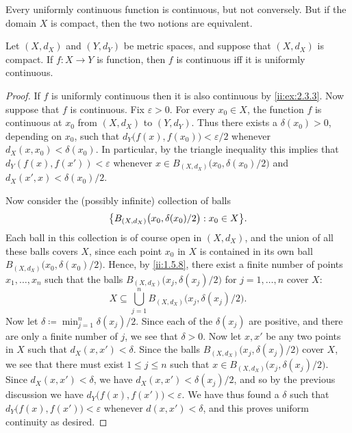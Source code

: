 \begin{note}
  Every uniformly continuous function is continuous, but not conversely.
  But if the domain \(X\) is compact, then the two notions are equivalent.
\end{note}

\begin{thm}\label{ii:2.3.5}
  Let \((X, d_X)\) and \((Y, d_Y)\) be metric spaces, and suppose that \((X, d_X)\) is compact.
  If \(f : X \to Y\) is function, then \(f\) is continuous iff it is uniformly continuous.
\end{thm}

\begin{proof}
  If \(f\) is uniformly continuous then it is also continuous by \cref{ii:ex:2.3.3}.
  Now suppose that \(f\) is continuous.
  Fix \(\varepsilon > 0\).
  For every \(x_0 \in X\), the function \(f\) is continuous at \(x_0\) from \((X, d_X)\) to \((Y, d_Y)\).
  Thus there exists a \(\delta(x_0) > 0\), depending on \(x_0\), such that \(d_Y\big(f(x), f(x_0)\big) < \varepsilon / 2\) whenever \(d_X(x, x_0) < \delta(x_0)\).
  In particular, by the triangle inequality this implies that \(d_Y(f(x), f(x')) < \varepsilon\) whenever \(x \in B_{(X, d_X)}\big(x_0, \delta(x_0) / 2\big)\) and \(d_X(x', x) < \delta(x_0) / 2\).

  Now consider the (possibly infinite) collection of balls
  \[
    \set{B_{(X, d_X)}\big(x_0, \delta(x_0) / 2\big) : x_0 \in X}.
  \]
  Each ball in this collection is of course open in \((X, d_X)\), and the union of all these balls covers \(X\), since each point \(x_0\) in \(X\) is contained in its own ball \(B_{(X, d_X)}\big(x_0, \delta(x_0) / 2\big)\).
  Hence, by \cref{ii:1.5.8}, there exist a finite number of points \(x_1, \dots, x_n\) such that the balls \(B_{(X, d_X)}\big(x_j, \delta(x_j) / 2\big)\) for \(j = 1, \dots, n\) cover \(X\):
  \[
    X \subseteq \bigcup_{j = 1}^n B_{(X, d_X)}\big(x_j, \delta(x_j) / 2\big).
  \]
  Now let \(\delta \coloneqq \min_{j = 1}^n \delta(x_j) / 2\).
  Since each of the \(\delta(x_j)\) are positive, and there are only a finite number of \(j\), we see that \(\delta > 0\).
  Now let \(x, x'\) be any two points in \(X\) such that \(d_X(x, x') < \delta\).
  Since the balls \(B_{(X, d_X)}\big(x_j, \delta(x_j) / 2\big)\) cover \(X\), we see that there must exist \(1 \leq j \leq n\) such that \(x \in B_{(X, d_X)}\big(x_j, \delta(x_j) / 2\big)\).
  Since \(d_X(x, x') < \delta\), we have \(d_X(x, x') < \delta(x_j) / 2\), and so by the previous discussion we have \(d_Y\big(f(x), f(x')\big) < \varepsilon\).
  We have thus found a \(\delta\) such that \(d_Y\big(f(x), f(x')\big) < \varepsilon\) whenever \(d(x, x') < \delta\), and this proves uniform continuity as desired.
\end{proof}

